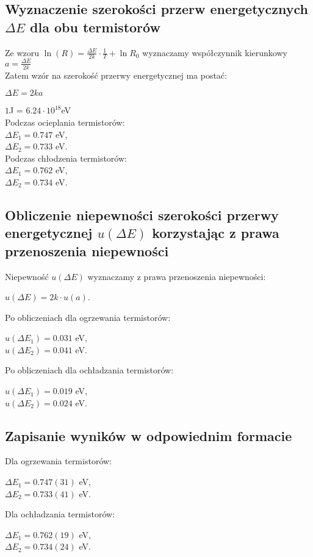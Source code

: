 \documentclass[12pt]{article}
\begin{document}
\subsection*{Wyznaczenie szerokości przerw energetycznych $\Delta E$
    dla obu termistorów}
Ze wzoru $\ln(R) = \frac{\Delta E}{2k} \cdot \frac{1}{T} + \ln{R_0}$
wyznaczamy współczynnik kierunkowy $a = \frac{\Delta E}{2k}$ \\
Zatem wzór na szerokość przerwy energetycznej ma postać:
\begin{center} $\Delta E = 2ka$ \end{center}
$1$J = $6.24 \cdot 10^{18}$eV \\
Podczas ocieplania termistorów: \\
\indent $\Delta E_1 = 0.747$ eV,\\
\indent $\Delta E_2 = 0.733$ eV. \\
Podczas chłodzenia termistorów: \\
\indent $\Delta E_1 = 0.762$ eV, \\
\indent $\Delta E_2 = 0.734$ eV.

\subsection*{Obliczenie niepewności szerokości przerwy energetycznej
    $u(\Delta E)$ korzystając z prawa przenoszenia niepewności}


Niepewność $u(\Delta E)$ wyznaczamy z prawa przenoszenia niepewności:
\begin{center}
    $u(\Delta E) = 2k \cdot u(a)$.
\end{center}
Po obliczeniach dla ogrzewania termistorów:
\begin{center}
    $u(\Delta E_1) = 0.031$ eV, \\
    $u(\Delta E_2) = 0.041$ eV.
\end{center}
Po obliczeniach dla ochładzania termistorów:
\begin{center}
    $u(\Delta E_1) = 0.019$ eV, \\
    $u(\Delta E_2) = 0.024$ eV.
\end{center}

\subsection*{Zapisanie wyników w odpowiednim formacie}
Dla ogrzewania termistorów:
\begin{center}
    $\Delta E_1 = 0.747(31)$ eV, \\
    $\Delta E_2 = 0.733(41)$ eV.
\end{center}
Dla ochładzania termistorów:
\begin{center}
    $\Delta E_1 = 0.762(19)$ eV, \\
    $\Delta E_2 = 0.734(24)$ eV.
\end{center}
\end{document}
